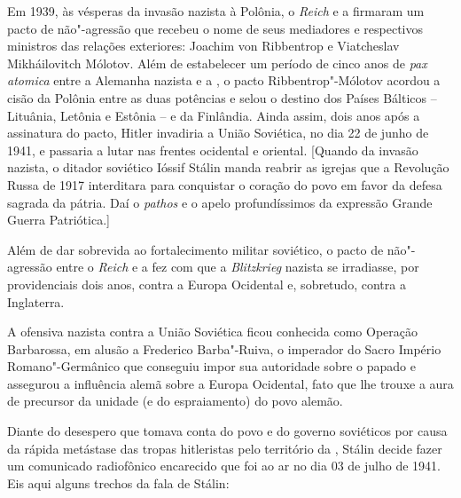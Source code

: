 Em 1939, às vésperas da invasão nazista à Polônia, o  \emph{Reich} e
a  firmaram um pacto de não"-agressão que recebeu o nome de seus
mediadores e respectivos ministros das relações exteriores: Joachim von
Ribbentrop e Viatcheslav Mikháilovitch Mólotov. Além de estabelecer um
período de cinco anos de \emph{pax atomica} entre a Alemanha nazista e a
, o pacto Ribbentrop"-Mólotov acordou a cisão da Polônia entre as
duas potências e selou o destino dos Países Bálticos -- Lituânia,
Letônia e Estônia -- e da Finlândia. Ainda assim, dois anos após a
assinatura do pacto, Hitler invadiria a União Soviética, no dia 22 de
junho de 1941, e passaria a lutar nas frentes ocidental e oriental.
{[}Quando da invasão nazista, o ditador soviético Ióssif Stálin manda
reabrir as igrejas que a Revolução Russa de 1917 interditara para
conquistar o coração do povo em favor da defesa sagrada da pátria. Daí o
\emph{pathos} e o apelo profundíssimos da expressão Grande Guerra
Patriótica.{]}

Além de dar sobrevida ao fortalecimento militar soviético, o pacto de
não"-agressão entre o  \emph{Reich} e a  fez com que a
\emph{Blitzkrieg} nazista se irradiasse, por providenciais dois anos,
contra a Europa Ocidental e, sobretudo, contra a Inglaterra.

A ofensiva nazista contra a União Soviética ficou conhecida como
Operação Barbarossa, em alusão a Frederico Barba"-Ruiva, o imperador do
Sacro Império Romano"-Germânico que conseguiu impor sua autoridade sobre
o papado e assegurou a influência alemã sobre a Europa Ocidental, fato
que lhe trouxe a aura de precursor da unidade (e do espraiamento) do
povo alemão.

Diante do desespero que tomava conta do povo e do governo soviéticos por
causa da rápida metástase das tropas hitleristas pelo território da
, Stálin decide fazer um comunicado radiofônico encarecido que foi
ao ar no dia 03 de julho de 1941. Eis aqui alguns trechos da fala de
Stálin:

